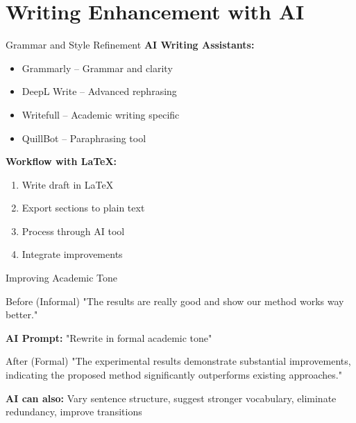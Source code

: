 \documentclass[aspectratio=169]{beamer}
\begin{document}
	\section{Writing Enhancement with AI}
	
	\begin{frame}{Grammar and Style Refinement}
		\textbf{AI Writing Assistants:}
		\begin{itemize}
			\item Grammarly -- Grammar and clarity
			\item DeepL Write -- Advanced rephrasing
			\item Writefull -- Academic writing specific
			\item QuillBot -- Paraphrasing tool
		\end{itemize}
		
		\vspace{0.5em}
		
		\textbf{Workflow with LaTeX:}
		\begin{enumerate}
			\item Write draft in LaTeX
			\item Export sections to plain text
			\item Process through AI tool
			\item Integrate improvements
		\end{enumerate}
	\end{frame}
	
	\begin{frame}{Improving Academic Tone}
		\begin{exampleblock}{Before (Informal)}
			"The results are really good and show our method works way better."
		\end{exampleblock}
		
		\vspace{0.3em}
		
		\textbf{AI Prompt:} "Rewrite in formal academic tone"
		
		\vspace{0.3em}
		
		\begin{exampleblock}{After (Formal)}
			"The experimental results demonstrate substantial improvements, indicating the proposed method significantly outperforms existing approaches."
		\end{exampleblock}
		
		\vspace{0.5em}
		
		\textbf{AI can also:} Vary sentence structure, suggest stronger vocabulary, eliminate redundancy, improve transitions
	\end{frame}
	
\end{document}

